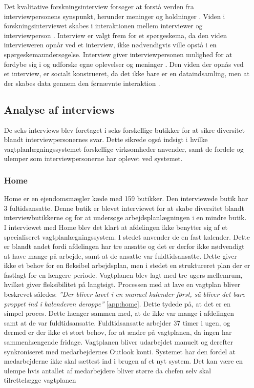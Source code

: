 Det kvalitative forskningsinterview forsøger at forstå verden fra interviewpersonens synspunkt, herunder meninger og holdninger \citep{kvale2009}. Viden i forskningsinterviewet skabes i interaktionen mellem interviewer og interviewperson \citep{kvale2009}. Interview er valgt frem for et spørgeskema, da den viden intervieweren opnår ved et interview, ikke nødvendigvis ville opstå i en spørgeskemaundersøgelse. Interview giver interviewpersonen mulighed for at fordybe sig i og udforske egne oplevelser og meninger \citep{kvale2009}. Den viden der opnås ved et interview, er socialt konstrueret, da det ikke bare er en dataindsamling, men at der skabes data gennem den førnævnte interaktion \citep{kvale2009}.

\subsection{Analyse af interviews}
De seks interviews blev foretaget i seks forskellige butikker for at sikre diversitet blandt interviewpersonernes svar. Dette sikrede også indsigt i hvilke vagtplanlægningssystemet forskellige virksomheder anvender, samt de fordele og ulemper som interviewpersonerne har oplevet ved systemet. 

\subsubsection{Home}
Home er en ejendomsmægler kæde med 159 butikker. Den interviewede butik har 3 fultidsansatte. Denne butik er blevet interviewet for at skabe diversitet blandt interviewbutikkerne og for at undersøge arbejdsplanlægningen i en mindre butik. I interviewet med Home blev det klart at afdelingen ikke benytter sig af  et specialiseret vagtplanlægningssystem. I stedet anvender de en fast kalender. Dette er blandt andet fordi afdelingen har tre ansatte og det er derfor ikke nødvendigt at have mange på arbejde, samt at de ansatte var fuldtidsansatte. Dette giver ikke et behov for en fleksibel arbejdsplan, men i stedet en struktureret plan der er fastlagt for en længere periode. Vagtplanen blev lagt med tre ugers mellemrum, hvilket giver fleksibilitet på langtsigt. Processen med at lave en vagtplan bliver beskrevet således: \textit{”Der bliver lavet i en manuel kalender først, så bliver det bare proppet ind i kalenderen deroppe”} \ref{app:home}. Dette tydede på, at det er en simpel proces. Dette hænger sammen med, at de ikke var mange i afdelingen samt at de var fuldtidsansatte. Fuldtidsansatte arbejder 37 timer i ugen, og dermed er der ikke et stort behov, for at ændre på vagtplanen, da ingen har sammenhængende fridage. Vagtplanen bliver udarbejdet manuelt og derefter synkroniseret med medarbejdernes Outlook konti. Systemet har den fordel at medarbejderne ikke skal sættest ind i brugen af et nyt system. Det kan være en ulempe hvis antallet af medarbejdere bliver større da chefen selv skal tilrettelægge vagtplanen

